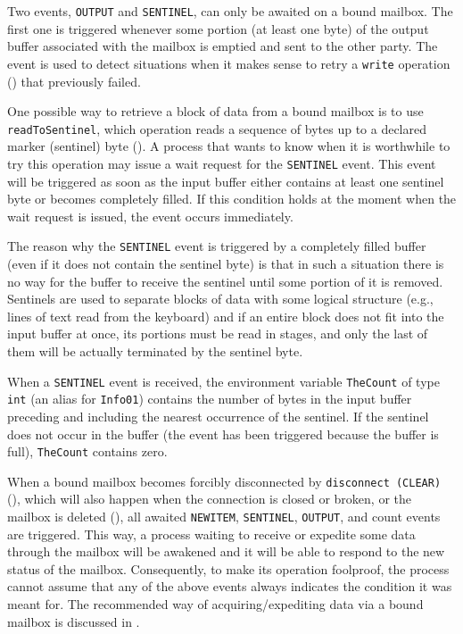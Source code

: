 Two events, {\tt OUTPUT} and {\tt SENTINEL},
can only be awaited on a bound mailbox.
The first one
is triggered whenever some portion (at least one byte) of the output buffer
associated with the mailbox is emptied and sent to the other party.
The event is used to detect situations when it makes sense to retry a
{\tt write} operation () that previously failed.

One possible way to retrieve a block of data from a bound mailbox is to
use {\tt readToSentinel}, which operation reads a sequence of bytes up
to a declared marker (sentinel) byte ().
A process that wants to know when it is worthwhile to try this operation
may issue a wait request for the {\tt SENTINEL} event.
This event will be triggered as soon as the input buffer either contains at
least one sentinel byte or becomes completely filled.
If this condition holds at the moment when the wait request is issued,
the event occurs immediately.

The reason why the {\tt SENTINEL} event is triggered by a completely
filled buffer (even if it does not contain the sentinel byte) is that
in such a situation there is no way for the buffer to receive the sentinel
until some portion of it is removed.
Sentinels are used to separate blocks of data with some logical structure
(e.g., lines of text read from the keyboard) and if an entire block
does not fit into the input buffer at once, its portions must be read
in stages, and only the last of them will be actually terminated by
the sentinel byte.

When a {\tt SENTINEL} event is received, the environment variable
{\tt TheCount} of type {\tt int} (an alias for {\tt Info01}) contains
the number of bytes in the input buffer preceding and including the
nearest occurrence of the sentinel.
If the sentinel does not occur in the buffer (the event has been
triggered because the buffer is full), {\tt TheCount} contains zero.

When a bound mailbox becomes forcibly disconnected
by {\tt disconnect~(CLEAR)} (), which will also happen
when the connection is closed or broken, or the mailbox is deleted
(),
all awaited {\tt NEWITEM}, {\tt SENTINEL}, {\tt OUTPUT}, and count
events are triggered.
This way, a process waiting to receive or expedite some data through
the mailbox will be awakened and it will be able to respond to the
new status of the mailbox.
Consequently, to make its operation foolproof, the process
cannot assume that any of the above events always indicates the condition
it was meant for.
The recommended way of acquiring/expediting data via a bound mailbox
is discussed in .


